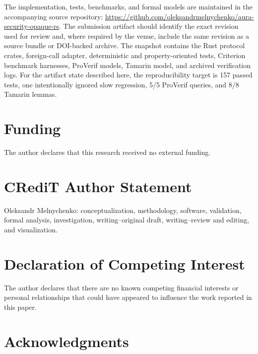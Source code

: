 \documentclass[preprint,12pt]{elsarticle}
\theoremstyle{remark}
\begin{document}
The implementation, tests, benchmarks, and formal models are maintained
in the accompanying source repository:
\url{https://github.com/oleksandrmelnychenko/aura-security-opaque-rs}.
The submission artifact should identify the exact revision used for
review and, where required by the venue, include the same revision as a
source bundle or DOI-backed archive. The snapshot contains the Rust
protocol crates, foreign-call adapter, deterministic and
property-oriented tests, Criterion benchmark harnesses, ProVerif models,
Tamarin model, and archived verification logs. For the artifact state
described here, the reproducibility target is 157 passed tests, one
intentionally ignored slow regression, 5/5 ProVerif queries, and 8/8
Tamarin lemmas.

\section*{Funding}

The author declares that this research received no external funding.

\section*{CRediT Author Statement}

Oleksandr Melnychenko: conceptualization, methodology, software,
validation, formal analysis, investigation, writing--original draft,
writing--review and editing, and visualization.

\section*{Declaration of Competing Interest}

The author declares that there are no known competing financial
interests or personal relationships that could have appeared to
influence the work reported in this paper.

\section*{Acknowledgments}
\end{document}

